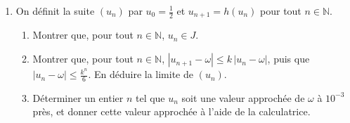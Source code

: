 \begin{exo}
\begin{description}
\begin{enumerate}
                \item On d\'efinit la suite $(u_n)$ par $u_0 = \frac{1}{2}$ et $u_{n+1} = h(u_n)$ pour tout $n \in \mathbb{N}$.
                    \begin{enumerate}
                    \item Montrer que, pour tout $n \in \mathbb{N}$, $u_n \in J$.
                    \item Montrer que, pour tout $n \in \mathbb{N}$, $|u_{n+1} - \omega| \leq k\,|u_n - \omega|$,
                          puis que $|u_n - \omega| \leq \frac{k^n}{6}$. En d\'eduire la limite de $(u_n)$.
                    \item D\'eterminer un entier $n$ tel que $u_n$ soit une valeur approch\'ee de $\omega$ \`a $10^{-3}$ pr\`es,
                          et donner cette valeur approch\'ee \`a l'aide de la calculatrice.
                    \end{enumerate}
                \end{enumerate}
      \end{description}
\end{exo}
%

